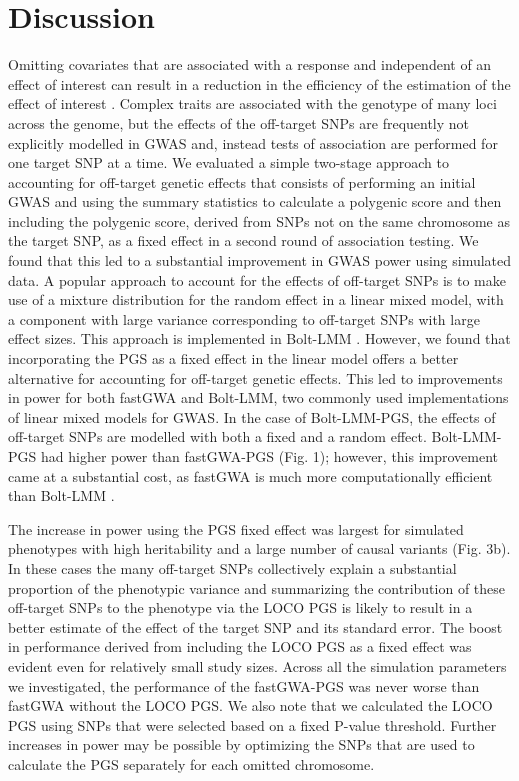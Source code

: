 \documentclass[fleqn,10pt]{wlscirep}
\begin{document}
\section*{Discussion}
Omitting covariates that are associated with a response and independent of an effect of interest can result in a reduction in the efficiency of the estimation of the effect of interest \cite{neuhaus1998estimation}. Complex traits are associated with the genotype of many loci across the genome, but the effects of the off-target SNPs are frequently not explicitly modelled in GWAS and, instead tests of association are performed for one target SNP at a time. We evaluated a simple two-stage approach to accounting for off-target genetic effects that consists of performing an initial GWAS and using the summary statistics to calculate a polygenic score and then including the polygenic score, derived from SNPs not on the same chromosome as the target SNP, as a fixed effect in a second round of association testing. We found that this led to a substantial improvement in GWAS power using simulated data. A popular approach to account for the effects of off-target SNPs is to make use of a mixture distribution for the random effect in a linear mixed model, with a component with large variance corresponding to off-target SNPs with large effect sizes. This approach is implemented in Bolt-LMM \cite{BOLT}. However, we found that incorporating the PGS as a fixed effect in the linear model offers a better alternative for accounting for off-target genetic effects. This led to improvements in power for both fastGWA and Bolt-LMM, two commonly used implementations of linear mixed models for GWAS. In the case of Bolt-LMM-PGS, the effects of off-target SNPs are modelled with both a fixed and a random effect. Bolt-LMM-PGS had higher power than fastGWA-PGS (Fig. 1); however, this improvement came at a substantial cost, as fastGWA is much more computationally efficient than Bolt-LMM \cite{jiang2019resource}. 

The increase in power using the PGS fixed effect was largest for simulated phenotypes with high heritability and a large number of causal variants (Fig. 3b). In these cases the many off-target SNPs collectively explain a substantial proportion of the phenotypic variance and summarizing the contribution of these off-target SNPs to the phenotype via the LOCO PGS is likely to result in a better estimate of the effect of the target SNP and its standard error. The boost in performance derived from including the LOCO PGS as a fixed effect was evident even for relatively small study sizes. Across all the simulation parameters we investigated, the performance of the fastGWA-PGS was never worse than fastGWA without the LOCO PGS. We also note that we calculated the LOCO PGS using SNPs that were selected based on a fixed P-value threshold. Further increases in power may be possible by optimizing the SNPs that are used to calculate the PGS separately for each omitted chromosome.
\end{document}
